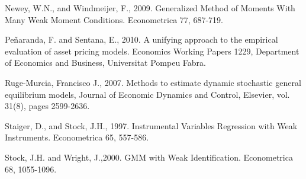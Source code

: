 \documentclass[11pt, fleqn]{article}
\begin{document}
Newey, W.N., and Windmeijer, F., 2009. Generalized Method of Moments With Many Weak Moment Conditions. Econometrica 77,  687-719.

 Pe\~{n}aranda, F. and  Sentana, E., 2010. A unifying approach to the empirical evaluation of asset pricing models. Economics Working Papers 1229, Department of Economics and Business, Universitat Pompeu Fabra.

Ruge-Murcia, Francisco J., 2007. Methods to estimate dynamic stochastic general equilibrium models, Journal of Economic Dynamics and Control, Elsevier, vol. 31(8), pages 2599-2636.

Staiger, D.,  and Stock, J.H., 1997.
Instrumental Variables Regression with Weak Instruments. Econometrica 65, 557-586.



Stock, J.H. and  Wright, J.,2000. GMM with Weak Identification. Econometrica 68,  1055-1096.
\end{document}
